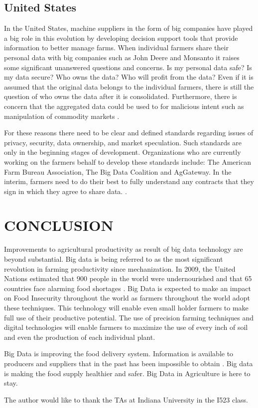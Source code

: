 \documentclass[sigconf]{acmart}
\begin{document}
\subsection {United States}

In the United States, machine suppliers in the form of big companies have played a big role in this evolution by developing decision support tools that provide information to better manage farms.  When individual farmers share their personal data with big companies such as John Deere and Monsanto it raises some significant unanswered questions and concerns. Is my personal data safe? Is my data secure? Who owns the data? Who will profit from the data? \cite{www-google-Crop}Even if  it is assumed that the original data belongs to the individual farmers, there is still the question of who owns the data after it is consolidated. Furthermore, there is concern that the aggregated data could be used to for malicious intent such as manipulation of commodity markets \cite{Wolfert}. 

For these reasons there need to be clear and defined standards regarding issues of privacy, security, data ownership, and market speculation. Such standards are only in the beginning stages of development. Organizations who are currently working on the farmers behalf to develop these standards include: The American Farm Bureau Association, The Big Data Coalition and AgGateway. In the interim, farmers need to do their best to fully understand any contracts that they sign in which they agree to share data.   \cite{Wolfert}.

\section{CONCLUSION}

Improvements to agricultural productivity as result of big data technology are beyond substantial.  Big data is being referred to as the most significant revolution in farming productivity since mechanization.  In 2009, the United Nations estimated that 900 people in the world were undernourished and that 65 countries face alarming food shortages \cite{DevEcon}. Big Data is expected to make an impact on Food Insecurity throughout the world as farmers throughout the world adopt these techniques. This technology will enable even small holder farmers to make full use of their productive potential. The use of precision farming techniques and digital technologies will enable farmers to maximize the use of every inch of soil and even the production of each individual plant.

Big Data is improving the food delivery system. Information is available to producers and suppliers that in the past has been impossible to obtain \cite{Wolfert}. Big data is making the food supply healthier and safer. Big Data in Agriculture is here to stay. 

 
\begin{acks}

  The author would like to thank the TAs at Indiana University in the I523 class.

\end{acks}


 
\end{document}
